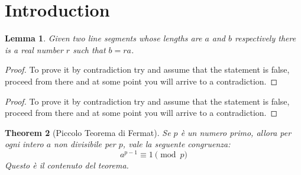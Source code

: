 \documentclass{article}
\newtheorem{theorem}{Theorem}[section]
\newtheorem{lemma}[theorem]{Lemma}
\begin{document}
\section{Introduction}

\begin{lemma}
\label{1.1}
Given two line segments whose lengths are \(a\) and \(b\) respectively there 
is a real number \(r\) such that \(b=ra\).
\end{lemma}

\renewcommand\qedsymbol{$\blacksquare$}

\begin{proof}
\label{1.2}
To prove it by contradiction try and assume that the statement is false,
proceed from there and at some point you will arrive to a contradiction.
\end{proof}

\renewcommand\qedsymbol{QED}

\begin{proof}
\label{1.3}
To prove it by contradiction try and assume that the statement is false,
proceed from there and at some point you will arrive to a contradiction.
\end{proof}

\begin{theorem}[Piccolo Teorema di Fermat]
\label{fermat_piccolo}
Se \(p\) è un numero primo, allora per ogni intero \(a\) non divisibile per \(p\), vale la seguente congruenza:
\[ a^{p-1} \equiv 1 \pmod{p} \]
Questo è il contenuto del teorema.
\end{theorem}
\end{document}
